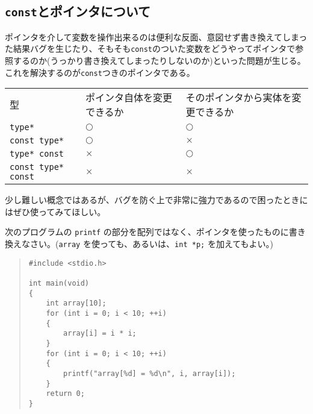 \subsection{\texttt{const}とポインタについて}
ポインタを介して変数を操作出来るのは便利な反面、意図せず書き換えてしまった結果バグを生じたり、そもそも\texttt{const}のついた変数をどうやってポインタで参照するのか(うっかり書き換えてしまったりしないのか)といった問題が生じる。これを解決するのが\texttt{const}つきのポインタである。

\begin{table}[H]
    \centering
    \begin{tabular}{lll}
        型                         & ポインタ自体を変更できるか & そのポインタから実体を変更できるか \\
        \texttt{type*}             & \(\bigcirc\)               & \(\bigcirc\)                       \\
        \texttt{const type*}       & \(\bigcirc\)               & \(\times\)                         \\
        \texttt{type* const}       & \(\times\)                 & \(\bigcirc\)                       \\
        \texttt{const type* const} & \(\times\)                 & \(\times\)
    \end{tabular}
\end{table} \noindent

少し難しい概念ではあるが、バグを防ぐ上で非常に強力であるので困ったときにはぜひ使ってみてほしい。
\begin{renshuu}\label{prob:5-1}
    次のプログラムの \texttt{printf} の部分を配列ではなく、ポインタを使ったものに書き換えなさい。(\texttt{array} を使っても、あるいは、\texttt{int *p;} を加えてもよい。)

    \begin{quote}
        \begin{verbatim}
#include <stdio.h>

int main(void)
{
    int array[10];
    for (int i = 0; i < 10; ++i)
    {
        array[i] = i * i;
    }
    for (int i = 0; i < 10; ++i)
    {
        printf("array[%d] = %d\n", i, array[i]);
    }
    return 0;
}
\end{verbatim}
    \end{quote}
\end{renshuu}

